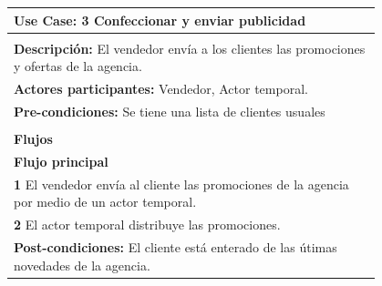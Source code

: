 \documentclass[12pt,a4paper,titlepage,oneside]{article}
\begin{document}
\begin{tabular}{| l | p{0.8\linewidth} |} \hline
	\multicolumn{2}{|p{0.8\linewidth}|}{\textbf{Use Case:} 3 Confeccionar y enviar publicidad} \\ \hline
	\multicolumn{2}{|c|}{} \\ \hline
	\multicolumn{2}{|p{0.8\linewidth}|}{\textbf{Descripci\'on:} El vendedor envía a los clientes las promociones y ofertas de la agencia.} \\ \hline
	\multicolumn{2}{|p{0.8\linewidth}|}{\textbf{Actores participantes:} Vendedor, Actor temporal.} \\ \hline
	\multicolumn{2}{|p{0.8\linewidth}|}{\textbf{Pre-condiciones:} Se tiene una lista de clientes usuales} \\ \hline
	\multicolumn{2}{|c|}{} \\ \hline
	\multicolumn{2}{|p{0.8\linewidth}|}{\textbf{Flujos}} \\ \hline
	\multicolumn{2}{|p{0.8\linewidth}|}{\textbf{Flujo principal}} \\ \hline
	\multicolumn{2}{|p{0.8\linewidth}|}{\textbf{1} El vendedor envía al cliente las promociones de la agencia por medio de un actor temporal.} \\ \hline
	\multicolumn{2}{|p{0.8\linewidth}|}{\textbf{2} El actor temporal distribuye las promociones.} \\ \hline
	\multicolumn{2}{|p{0.8\linewidth}|}{\textbf{Post-condiciones:} El cliente está enterado de las útimas novedades de la agencia.}\\ \hline
\end{tabular} \\\\
\\\\\\\\
\end{document}
